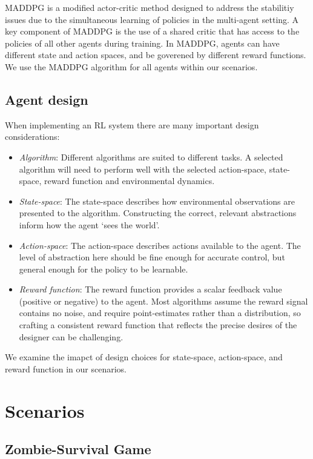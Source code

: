 \documentclass[11pt,a4paper]{article}
\begin{document}
MADDPG is a modified actor-critic method designed to address the stabilitiy issues due to the simultaneous learning of policies in the multi-agent setting.
A key component of MADDPG is the use of a shared critic that has access to the policies of all other agents during training.
In MADDPG, agents can have different state and action spaces, and be goverened by different reward functions.
We use the MADDPG algorithm for all agents within our scenarios.

\subsection{Agent design}

When implementing an RL system there are many important design considerations:

\begin{itemize}
  \item \emph{Algorithm}: Different algorithms are suited to different tasks. A selected algorithm will need to perform well with the selected action-space, state-space, reward function and environmental dynamics.
  \item \emph{State-space}: The state-space describes how environmental observations are presented to the algorithm. Constructing the correct, relevant abstractions inform how the agent `sees the world'.
  \item \emph{Action-space}: The action-space describes actions available to the agent. The level of abstraction here should be fine enough for accurate control, but general enough for the policy to be learnable.
  \item \emph{Reward function}: The reward function provides a scalar feedback value (positive or negative) to the agent. Most algorithms assume the reward signal contains no noise, and require point-estimates rather than a distribution, so crafting a consistent reward function that reflects the precise desires of the designer can be challenging.
\end{itemize}

We examine the imapct of design choices for state-space, action-space, and reward function in our scenarios.

\section{Scenarios}
\label{sec:scenarios}

\subsection{Zombie-Survival Game}
\label{sec:game}
\end{document}
